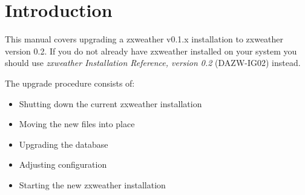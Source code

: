 \documentclass[a4paper,10pt,draft]{book}
\newcommand{\partnumber}{\ifthenelse{\isundefined{\projectnum}}{}{\projectnum-\docnum	\ifthenelse{\equal{\docrev}{001}}{}{.\docrev}}}
\begin{document}

\ifthenelse{\isundefined{\ordernumber}}{

\title{\doctitle{} - \docsubtitle}
\author{\docauthor}
}{

\title{\doctitle}
\subtitle{\docsubtitle}
\titleabstract{\docabstract}
\ordernumber{\partnumber}
\updateinfo{\docupdateinfo}
\osinfo{\docosver}
\swversion{\docswver}
\titlecopyright{\doccopyright}
\licensestatement{\doclicense}
}
\date{\docdate}

\maketitle

\clearpage

\tableofcontents
\clearpage


\chapter{Introduction}
\setcounter{page}{1}

This manual covers upgrading a zxweather v0.1.x installation to zxweather version 0.2. If you do not already have zxweather installed on your system you should use \emph{zxweather Installation Reference, version 0.2} (DAZW-IG02) instead.


The upgrade procedure consists of:
\begin{itemize}
\item Shutting down the current zxweather installation
\item Moving the new files into place
\item Upgrading the database
\item Adjusting configuration
\item Starting the new zxweather installation
\end{itemize}
\end{document}
